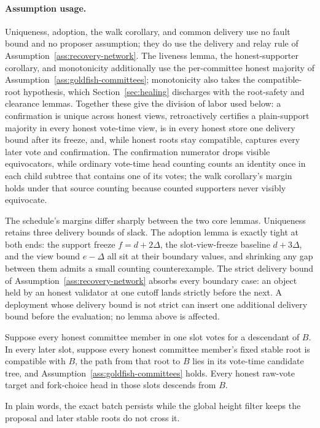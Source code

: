 \paragraph{Assumption usage.}
Uniqueness, adoption, the walk corollary, and common delivery use no
fault bound and no proposer assumption; they do use the delivery and
relay rule of Assumption~\ref{ass:recovery-network}.  The liveness lemma, the
honest-supporter corollary, and monotonicity additionally use the
per-committee honest majority of
Assumption~\ref{ass:goldfish-committees}; monotonicity also takes the
compatible-root hypothesis, which Section~\ref{sec:healing} discharges
with the root-safety and clearance lemmas.  Together these give the
division of labor used below: a confirmation is unique across honest
views, retroactively certifies a plain-support majority in every honest
vote-time view, is in every honest store one delivery bound after its
freeze,
and, while honest roots stay compatible, captures every later vote and
confirmation.  The confirmation numerator drops visible equivocators, while ordinary
vote-time head counting counts an identity once in each child subtree that
contains one of its votes; the walk corollary's margin holds under that
source counting because counted supporters never visibly equivocate.

The schedule's margins differ sharply between the two core lemmas.
Uniqueness retains three delivery bounds of slack.  The adoption lemma is
exactly tight at both ends: the support freeze \(f=d+2\Delta\), the
slot-view-freeze baseline \(d+3\Delta\), and the view bound \(e-\Delta\)
all sit at their boundary values, and shrinking any gap between them
admits a small counting counterexample.  The strict delivery bound of
Assumption~\ref{ass:recovery-network} absorbs every boundary case: an
object held by an honest validator at one cutoff lands strictly before
the next.  A deployment whose delivery bound is not strict can insert one
additional delivery bound before the evaluation; no lemma above is
affected.

\begin{lemma}
\label{lem:recovery-rooted-persistence}
Suppose every honest committee member in one slot votes for a descendant
of \(B\).  In every later slot, suppose every honest committee member's
fixed stable root is compatible with \(B\), the path from that root to \(B\)
lies in its vote-time candidate tree, and
Assumption~\ref{ass:goldfish-committees} holds.  Every honest raw-vote
target and fork-choice head in those slots descends from \(B\).

In plain words, the exact batch persists while the global height filter keeps
the proposal and later stable roots do not cross it.
\end{lemma}

